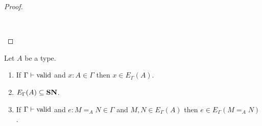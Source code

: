 \begin{proof}
{\begin{code}
%
\\
\> \AgdaSymbol{(}  \AgdaSymbol{(}    \AgdaSymbol{\_}  \AgdaSymbol{))} \AgdaSymbol{=}  \AgdaSymbol{\{} \AgdaSymbol{=} \AgdaSymbol{\}} \AgdaSymbol{\{} \AgdaSymbol{=} \AgdaSymbol{\}}  \AgdaSymbol{(} \AgdaSymbol{)}\<%
\end{code}
}
\end{proof}

\begin{lemma}
\label{lm:varcompute2}
Let $A$ be a type.
\begin{enumerate}
\item
If $\Gamma \vdash \mathrm{valid}$ and $x : A \in \Gamma$ then $x \in E_\Gamma(A)$.

\begin{code}%
\>  \AgdaSymbol{:}  \AgdaSymbol{\{}\AgdaSymbol{\}} \AgdaSymbol{\{} \AgdaSymbol{:}  \AgdaSymbol{\}} \AgdaSymbol{\{} \AgdaSymbol{:}   \AgdaSymbol{\}}       \AgdaSymbol{(}  \AgdaSymbol{)} \AgdaSymbol{(} \AgdaSymbol{)}\<%
\end{code}
\item
$E_\Gamma(A) \subseteq \mathbf{SN}$.

\begin{code}%
\>  \AgdaSymbol{:}  \AgdaSymbol{\{}\AgdaSymbol{\}} \AgdaSymbol{\{} \AgdaSymbol{:}  \AgdaSymbol{\}} \AgdaSymbol{\{}\AgdaSymbol{\}} \AgdaSymbol{\{} \AgdaSymbol{:}  \AgdaSymbol{\}}    \AgdaSymbol{(} \AgdaSymbol{)}    \<%
\end{code}
\item
If $\Gamma \vdash \mathrm{valid}$ and $e : M =_A N \in \Gamma$ and $M, N \in E_\Gamma(A)$ then $e \in E_\Gamma(M =_A N)$.


\end{enumerate}
\end{lemma}
